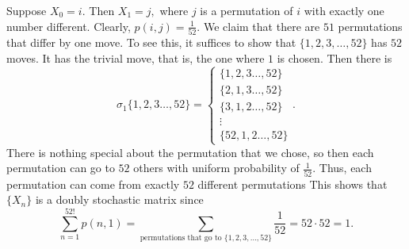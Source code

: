 \documentclass[11pt]{article}
\begin{document}
\begin{enumerate}
\begin{enumerate}
\begin{solution}
        Suppose $X_0 = i.$ Then $X_1 = j,$ where $j$ is a permutation of $i$ with exactly one number different.  Clearly, $p(i,j) = \frac{1}{52}.$  We claim that there are $51$ permutations that differ by one move. To see this, it suffices to show that 
        $\{1,2,3,\dots, 52\}$ has $52$ moves. It has the trivial move, that is, the one where $1$ is chosen. Then there is 
        \[\sigma_1\{1,2,3\dots, 52\} = \begin{cases}
            \{1,2,3\dots, 52\}\\
            \{2,1, 3\dots, 52\}\\
            \{3,1,2\dots, 52\}\\
            \vdots\\
            \{52,1,2\dots, 52\}
        \end{cases}.\] There is nothing special about the permutation that we chose, so then each permutation can go to $52$ others with uniform probability of $\frac{1}{52}.$ Thus, each permutation can come from exactly $52$ different permutations This shows that $\{X_n\}$ is a doubly stochastic matrix since 
        \[\sum_{n=1}^{52!}p(n, 1) = \sum_{\text{permutations that go to $\{1,2,3,\dots, 52\}$}}\frac{1}{52} = 52\cdot 52 = 1.\]


\end{solution}
\end{enumerate}
\end{enumerate}
\end{document}
